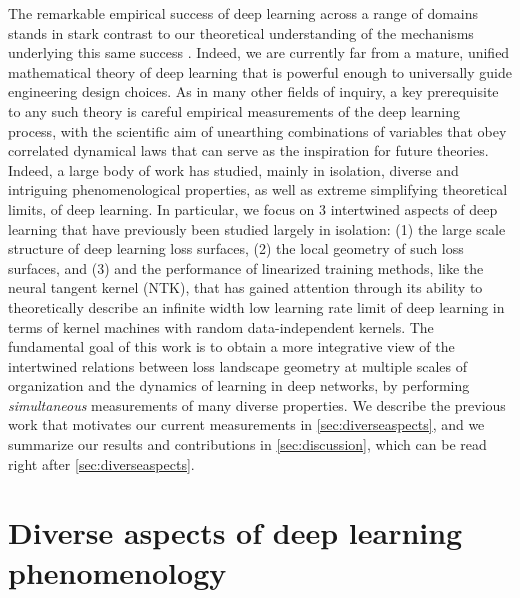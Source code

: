 \documentclass{article}
\begin{document}
The remarkable empirical success of deep learning across a range of domains stands in stark contrast to our theoretical understanding of the mechanisms underlying this same success \cite{Bahri2020-mi}. Indeed, we are currently far from a mature, unified mathematical theory of deep learning that is powerful enough to universally guide engineering design choices.  
As in many other fields of inquiry, a key prerequisite to any such theory is careful empirical measurements of the deep learning process, with the scientific aim of unearthing combinations of variables that obey correlated dynamical laws that can serve as the inspiration for future theories.  
Indeed, a large body of work has studied, mainly in isolation, diverse and intriguing phenomenological properties, as well as extreme simplifying theoretical limits, of deep learning. 
In particular, we focus on $3$ intertwined aspects of deep learning that have previously been studied largely in isolation: (1) the large scale structure of deep learning loss surfaces, (2) the local geometry of such loss surfaces, and (3) and the performance of linearized training methods, like the neural tangent kernel (NTK), that has gained attention through its ability to theoretically describe an infinite width low learning rate limit of deep learning in terms of kernel machines with random data-independent kernels.  
The fundamental goal of this work is to obtain a more integrative view of the intertwined relations between loss landscape geometry at multiple scales of organization and the dynamics of learning in deep networks, by performing {\it simultaneous} measurements of many diverse properties.  
We describe the previous work that motivates our current measurements in \cref{sec:diverseaspects}, and we summarize our results and contributions in \cref{sec:discussion}, which can be read right after \cref{sec:diverseaspects}.

\vspace{-0.3cm}
\section{Diverse aspects of deep learning phenomenology}
\vspace{-0.3cm}
\label{sec:diverseaspects} 
\end{document}
